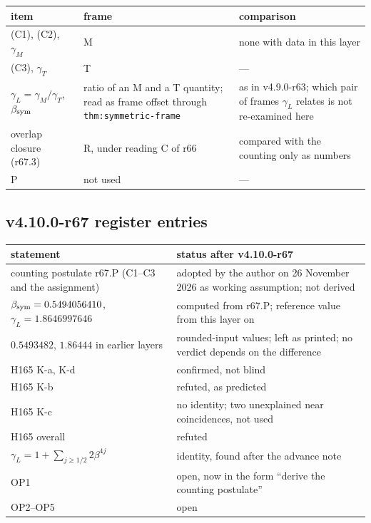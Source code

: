 \begin{center}
\small
\begin{tabular}{@{}>{\raggedright\arraybackslash}p{}>{\raggedright\arraybackslash}p{}>{\raggedright\arraybackslash}p{}@{}}
\toprule
item & frame & comparison\\
\midrule
(C1), (C2), \(\gamma_M\) & M & none with data in this layer\\
(C3), \(\gamma_T\) & T & ---\\
\(\gamma_L=\gamma_M/\gamma_T\), \(\beta_{\rm sym}\) & ratio of an M and a T quantity; read as frame offset through \texttt{thm:symmetric-frame} & as in v4.9.0-r63; which pair of frames \(\gamma_L\) relates is not re-examined here\\
overlap closure (r67.3) & R, under reading C of r66 & compared with the counting only as numbers\\
P & not used & ---\\
\bottomrule
\end{tabular}
\end{center}

\subsection*{v4.10.0-r67 register entries}
\label{subsec:v4100-r67-register}

\begin{center}
\small
\begin{tabular}{@{}>{\raggedright\arraybackslash}p{}>{\raggedright\arraybackslash}p{}@{}}
\toprule
statement & status after v4.10.0-r67\\
\midrule
counting postulate r67.P (C1--C3 and the assignment) & adopted by the author on 26 November 2026 as working assumption; not derived\\
\(\beta_{\rm sym}=0.5494056410\), \(\gamma_L=1.8646997646\) & computed from r67.P; reference value from this layer on\\
\(0.5493482\), \(1.86444\) in earlier layers & rounded-input values; left as printed; no verdict depends on the difference\\
H165 K-a, K-d & confirmed, not blind\\
H165 K-b & refuted, as predicted\\
H165 K-c & no identity; two unexplained near coincidences, not used\\
H165 overall & refuted\\
\(\gamma_L=1+\sum_{j\ge1/2}2\beta^{4j}\) & identity, found after the advance note\\
OP1 & open, now in the form ``derive the counting postulate''\\
OP2--OP5 & open\\
\bottomrule
\end{tabular}
\end{center}

